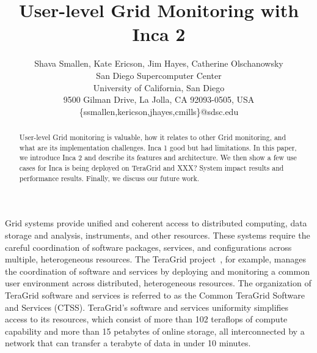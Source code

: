 \documentclass[times,10pt,twocolumn]{article}
\begin{document}
\title{User-level Grid Monitoring with Inca 2}

\author{Shava Smallen, Kate Ericson, Jim Hayes, Catherine Olschanowsky \\
San Diego Supercomputer Center\\ University of California, San Diego\\ 
9500 Gilman Drive, La Jolla, CA 92093-0505, USA\\ 
\{ssmallen,kericson,jhayes,cmills\}@sdsc.edu\\
}

\maketitle
\thispagestyle{empty}


\begin{abstract}
User-level Grid monitoring is valuable, how it relates to other Grid
monitoring,  and what are its implementation challenges.
Inca 1 good but had limitations.  In this paper, we introduce Inca 2 and
describe its features and architecture.  We then show a few use cases for Inca
is being deployed on TeraGrid and XXX?  System impact results and performance
results.  Finally, we discuss our future work.  
\end{abstract}


Grid systems provide unified and coherent access to distributed computing,
data storage and analysis, instruments, and other resources.  These systems
require the careful coordination of software packages, services, and
configurations across multiple, heterogeneous resources.  The TeraGrid
project~\cite{teragrid}, for example, manages the coordination of software and
services by deploying and monitoring a common user environment across
distributed, heterogeneous resources. The organization of TeraGrid software
and services is referred to as the Common TeraGrid Software and Services
(CTSS).  TeraGrid's software and services uniformity simplifies access to its
resources, which consist of more than 102 teraflops of compute capability and
more than 15 petabytes of online storage, all interconnected by a network that
can transfer a terabyte of data in under 10 minutes.  
\end{document}

